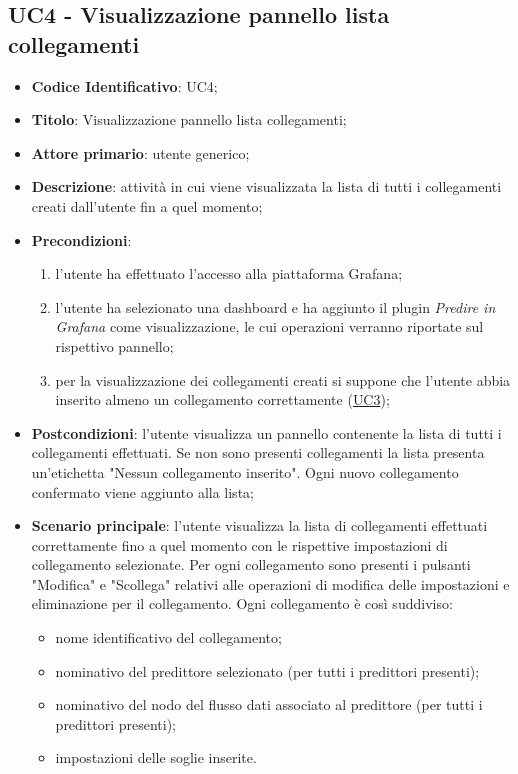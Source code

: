 	\subsection{UC4 - Visualizzazione pannello lista collegamenti}
		\begin{itemize}
			\item\textbf{Codice Identificativo}: UC4;
			\item\textbf{Titolo}: Visualizzazione pannello lista collegamenti;
			\item\textbf{Attore primario}: utente generico;
			\item\textbf{Descrizione}: attività in cui viene visualizzata la lista di tutti i collegamenti creati dall'utente fin a quel momento;
			\item\textbf{Precondizioni}: 
			\begin{enumerate}
			 	\item l'utente ha effettuato l'accesso alla piattaforma Grafana;
				\item l'utente ha selezionato una dashboard e ha aggiunto il plugin \textit{Predire in Grafana} come visualizzazione, le cui operazioni verranno riportate sul rispettivo pannello;
				\item per la visualizzazione dei collegamenti creati si suppone che l'utente abbia inserito almeno un collegamento correttamente (\hyperref[par:UC3]{UC3});
\end{enumerate}			
			\item\textbf{Postcondizioni}: l'utente visualizza un pannello contenente la lista di tutti i collegamenti effettuati. Se non sono presenti collegamenti la lista presenta un'etichetta "Nessun collegamento inserito". Ogni nuovo collegamento confermato viene aggiunto alla lista;
			\item\textbf{Scenario principale}: l'utente visualizza la lista di collegamenti effettuati correttamente fino a quel momento con le rispettive impostazioni di collegamento selezionate. Per ogni collegamento sono presenti i pulsanti "Modifica" e "Scollega" relativi alle operazioni di modifica delle impostazioni e eliminazione per il collegamento. Ogni collegamento è così suddiviso:
					\begin{itemize}
						\item nome identificativo del collegamento;
						\item nominativo del predittore selezionato (per tutti i predittori presenti);
						\item nominativo del nodo del flusso dati associato al predittore (per tutti i predittori presenti);
						\item impostazioni delle soglie inserite.
					\end{itemize}
							
		\end{itemize}


